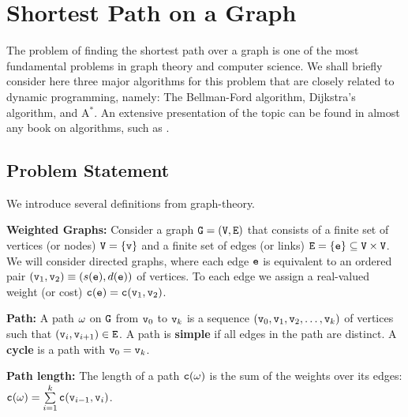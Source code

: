 


\section{Shortest Path on a Graph}
The problem of finding the shortest path over a graph is one of the most fundamental problems in graph theory and computer science. We shall briefly consider here three major algorithms for this problem that are closely related to dynamic programming, namely: The Bellman-Ford algorithm, Dijkstra's algorithm, and A$^*$.
An extensive presentation of the topic can be found in almost any book on algorithms, such as \cite{cormen2009introduction,KleinbergTardos06,DasguptaPapadimitriouVazirani08}.

\subsection{Problem Statement}
We introduce several definitions from graph-theory.
\begin{definition}\textbf{Weighted Graphs:} Consider a graph ${\tt G} = ({\tt V},{\tt E})$ that consists of a finite set of vertices (or nodes) ${\tt V} = \{ {\tt v}\} $ and a finite set of edges (or links) ${\tt E} = \{ {\tt e}\} \subseteq {\tt V}\times{\tt V}$. We will consider directed graphs, where each edge ${\tt e}$ is equivalent to an ordered pair $({{\tt v}_1},{{\tt v}_2}) \equiv (s({\tt e}),d({\tt e}))$ of vertices. To each edge we assign a real-valued weight (or cost) ${\tt c}({\tt e}) = {\tt c}({{\tt v}_1},{{\tt v}_2})$.
\end{definition}
\begin{definition}\textbf{Path:}
A path ${\tt \omega}$ on ${\tt G}$ from ${{\tt v}_0}$ to ${{\tt v}_k}$ is a sequence $({{\tt v}_0},{{\tt v}_1},{{\tt v}_2}, \ldots ,{{\tt v}_k})$ of vertices such that $({{\tt v}_i},{{\tt v}_{i + 1}}) \in {\tt E}$. A path is \textbf{simple} if all edges in the path are distinct.
A \textbf{cycle}  is a path with ${{\tt v}_0} = {{\tt v}_k}$.
\end{definition}
\begin{definition}\textbf{Path length:}
The length of a path ${\tt c}({\tt \omega})$ is the sum of the weights over its edges:
${\tt c}({\tt \omega}) = \sum\limits_{i = 1}^k {{\tt c}({{\tt v}_{i - 1}},{{\tt v}_i})} $.
\end{definition}

